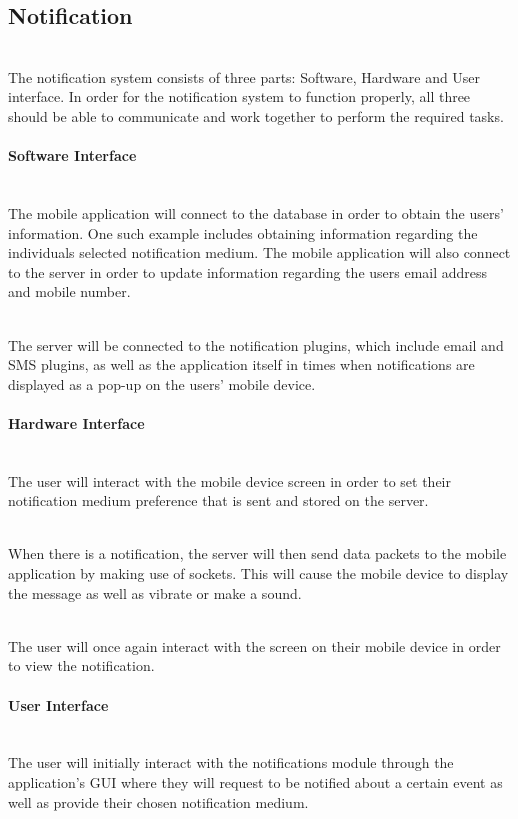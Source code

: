 \documentclass[runningheads,a4paper]{article}
\begin{document}
\subsection{Notification}

\mbox{}\\
The notification system consists of three parts: Software, Hardware and User interface. In order for the notification system to function properly, all three should be able to communicate and work together to perform the required tasks. 


\paragraph{Software Interface}
\mbox{}\\
The mobile application will connect to the database in order to obtain the users’ information. One such example includes obtaining information regarding the individuals selected notification medium. The mobile application will also connect to the server in order to update information regarding the users email address and mobile number.

\mbox{}\\
The server will be connected to the notification plugins, which include email and SMS plugins, as well as the application itself in times when notifications are displayed as a pop-up on the users’ mobile device.



\paragraph{Hardware Interface}

\mbox{}\\
The user will interact with the mobile device screen in order to set their notification medium preference that is sent and stored on the server. 

\mbox{}\\
When there is a notification, the server will then send data packets to the mobile application by making use of sockets. This will cause the mobile device to display the message as well as vibrate or make a sound. 

\mbox{}\\
The user will once again interact with the screen on their mobile device in order to view the notification.

\paragraph{User Interface}
\mbox{}\\
The user will initially interact with the notifications module through the application’s GUI where they will request to be notified about a certain event as well as provide their chosen notification medium. 
\end{document}
